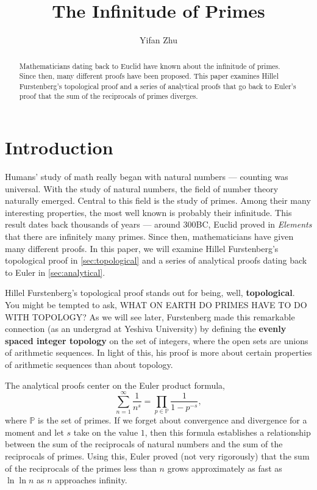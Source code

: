 \documentclass[a4paper]{article}
\theoremstyle{definition}
\theoremstyle{remark}
\begin{document}
\title{The Infinitude of Primes}
\author{
Yifan Zhu
}
\maketitle

\begin{abstract}
  Mathematicians dating back to Euclid have known about the infinitude of primes. Since then, many different proofs have been proposed. This paper examines Hillel Furstenberg's topological proof and a series of analytical proofs that go back to Euler's proof that the sum of the reciprocals of primes diverges.
\end{abstract}

\section{Introduction}
Humans' study of math really began with natural numbers --- counting was universal. With the study of natural numbers, the field of number theory naturally emerged. Central to this field is the study of primes. Among their many interesting properties, the most well known is probably their infinitude. This result dates back thousands of years --- around 300BC, Euclid proved in \textit{Elements} that there are infinitely many primes. \cite{bib:mathHistory} Since then, mathematicians have given many different proofs. In this paper, we will examine Hillel Furstenberg's topological proof in \cref{sec:topological} and a series of analytical proofs dating back to Euler in \cref{sec:analytical}.

Hillel Furstenberg's topological proof stands out for being, well, \textbf{topological}. You might be tempted to ask, {WHAT ON EARTH DO PRIMES HAVE TO DO WITH TOPOLOGY?} As we will see later, Furstenberg made this remarkable connection (as an undergrad at Yeshiva University) by defining the \textbf{evenly spaced integer topology} on the set of integers, where the open sets are unions of arithmetic sequences. In light of this, his proof is more about certain properties of arithmetic sequences than about topology. \cite{bib:Furstenberg} \cite{bib:proofsFromTheBook} 

The analytical proofs center on the Euler product formula,
\[
\sum^\infty_{n=1}\frac{1}{n^s}=\prod_{p\in\mathbb{P}}\frac{1}{1-p^{-s}}
,
\]
where $\mathbb{P}$ is the set of primes.
If we forget about convergence and divergence for a moment and let $s$ take on the value $1$, then this formula establishes a relationship between the sum of the reciprocals of natural numbers and the sum of the reciprocals of primes. Using this, Euler proved (not very rigorously) that the sum of the reciprocals of the primes less than $n$ grows approximately as fast as $\ln\ln n$ as $n$ approaches infinity.
\end{document}
